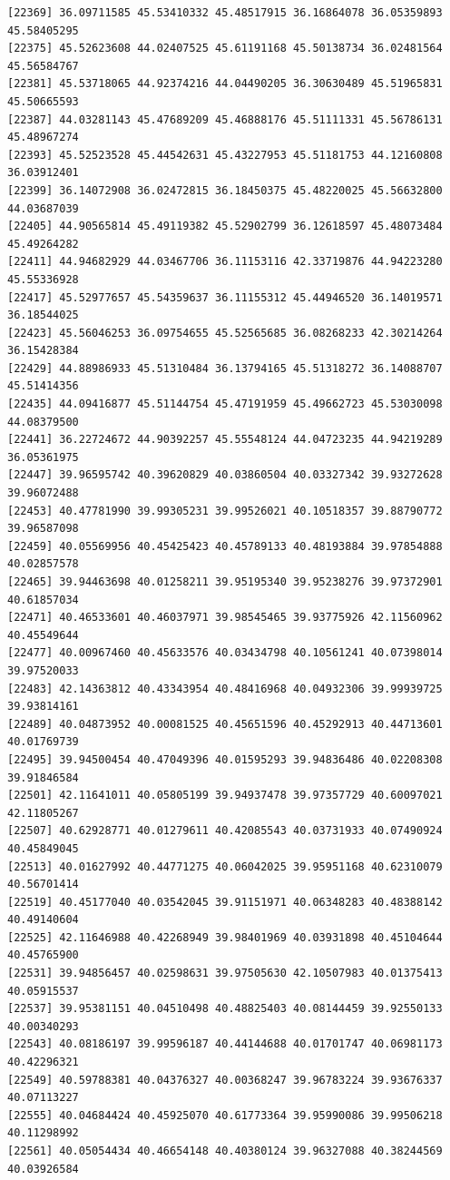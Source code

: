 \documentclass[
  letterpaper,
  DIV=11,
  numbers=noendperiod]{scrartcl}
\begin{document}
\begin{verbatim}
[22369] 36.09711585 45.53410332 45.48517915 36.16864078 36.05359893 45.58405295
[22375] 45.52623608 44.02407525 45.61191168 45.50138734 36.02481564 45.56584767
[22381] 45.53718065 44.92374216 44.04490205 36.30630489 45.51965831 45.50665593
[22387] 44.03281143 45.47689209 45.46888176 45.51111331 45.56786131 45.48967274
[22393] 45.52523528 45.44542631 45.43227953 45.51181753 44.12160808 36.03912401
[22399] 36.14072908 36.02472815 36.18450375 45.48220025 45.56632800 44.03687039
[22405] 44.90565814 45.49119382 45.52902799 36.12618597 45.48073484 45.49264282
[22411] 44.94682929 44.03467706 36.11153116 42.33719876 44.94223280 45.55336928
[22417] 45.52977657 45.54359637 36.11155312 45.44946520 36.14019571 36.18544025
[22423] 45.56046253 36.09754655 45.52565685 36.08268233 42.30214264 36.15428384
[22429] 44.88986933 45.51310484 36.13794165 45.51318272 36.14088707 45.51414356
[22435] 44.09416877 45.51144754 45.47191959 45.49662723 45.53030098 44.08379500
[22441] 36.22724672 44.90392257 45.55548124 44.04723235 44.94219289 36.05361975
[22447] 39.96595742 40.39620829 40.03860504 40.03327342 39.93272628 39.96072488
[22453] 40.47781990 39.99305231 39.99526021 40.10518357 39.88790772 39.96587098
[22459] 40.05569956 40.45425423 40.45789133 40.48193884 39.97854888 40.02857578
[22465] 39.94463698 40.01258211 39.95195340 39.95238276 39.97372901 40.61857034
[22471] 40.46533601 40.46037971 39.98545465 39.93775926 42.11560962 40.45549644
[22477] 40.00967460 40.45633576 40.03434798 40.10561241 40.07398014 39.97520033
[22483] 42.14363812 40.43343954 40.48416968 40.04932306 39.99939725 39.93814161
[22489] 40.04873952 40.00081525 40.45651596 40.45292913 40.44713601 40.01769739
[22495] 39.94500454 40.47049396 40.01595293 39.94836486 40.02208308 39.91846584
[22501] 42.11641011 40.05805199 39.94937478 39.97357729 40.60097021 42.11805267
[22507] 40.62928771 40.01279611 40.42085543 40.03731933 40.07490924 40.45849045
[22513] 40.01627992 40.44771275 40.06042025 39.95951168 40.62310079 40.56701414
[22519] 40.45177040 40.03542045 39.91151971 40.06348283 40.48388142 40.49140604
[22525] 42.11646988 40.42268949 39.98401969 40.03931898 40.45104644 40.45765900
[22531] 39.94856457 40.02598631 39.97505630 42.10507983 40.01375413 40.05915537
[22537] 39.95381151 40.04510498 40.48825403 40.08144459 39.92550133 40.00340293
[22543] 40.08186197 39.99596187 40.44144688 40.01701747 40.06981173 40.42296321
[22549] 40.59788381 40.04376327 40.00368247 39.96783224 39.93676337 40.07113227
[22555] 40.04684424 40.45925070 40.61773364 39.95990086 39.99506218 40.11298992
[22561] 40.05054434 40.46654148 40.40380124 39.96327088 40.38244569 40.03926584

\end{verbatim}
\end{document}
